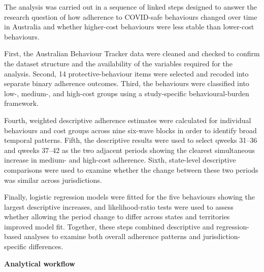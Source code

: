 \documentclass[
  12pt,
  a4paper,
]{article}
\begin{document}
The analysis was carried out in a sequence of linked steps designed to
answer the research question of how adherence to COVID-safe behaviours
changed over time in Australia and whether higher-cost behaviours were
less stable than lower-cost behaviours.

First, the Australian Behaviour Tracker data were cleaned and checked to
confirm the dataset structure and the availability of the variables
required for the analysis. Second, 14 protective-behaviour items were
selected and recoded into separate binary adherence outcomes. Third, the
behaviours were classified into low-, medium-, and high-cost groups
using a study-specific behavioural-burden framework.

Fourth, weighted descriptive adherence estimates were calculated for
individual behaviours and cost groups across nine six-wave blocks in
order to identify broad temporal patterns. Fifth, the descriptive
results were used to select qweeks 31--36 and qweeks 37--42 as the two
adjacent periods showing the clearest simultaneous increase in medium-
and high-cost adherence. Sixth, state-level descriptive comparisons were
used to examine whether the change between these two periods was similar
across jurisdictions.

Finally, logistic regression models were fitted for the five behaviours
showing the largest descriptive increases, and likelihood-ratio tests
were used to assess whether allowing the period change to differ across
states and territories improved model fit. Together, these steps
combined descriptive and regression-based analyses to examine both
overall adherence patterns and jurisdiction-specific differences.

\begin{center}

\textbf{Analytical workflow}

\vspace{0.2cm}


\end{center}
\end{document}

